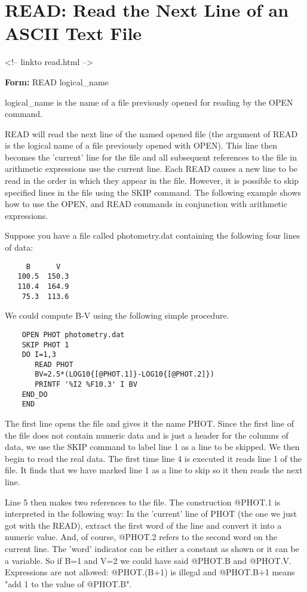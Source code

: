 \section{READ: Read the Next Line of an ASCII Text File}
\begin{rawhtml}
<!-- linkto read.html -->
\end{rawhtml}
\begin{command}
  \item[\textbf{Form: }READ logical\_name\hfill]{}
  \item[logical\_name]{is the name of a file previously
       opened for reading by the OPEN command.}
\end{command}

READ will read the next line of the named opened file (the argument of READ
is the logical name of a file previously opened with OPEN).  This line then
becomes the 'current' line for the file and all subsequent references to
the file in arithmetic expressions use the current line.  Each READ causes
a new line to be read in the order in which they appear in the file.
However, it is possible to skip specified lines in the file using the SKIP
command. The following example shows how to use the OPEN, and READ commands
in conjunction with arithmetic expressions.

Suppose you have a file called photometry.dat containing the following four
lines of data:
\begin{verbatim}
     B      V
   100.5  150.3
   110.4  164.9
    75.3  113.6
\end{verbatim}
We could compute B-V using the following simple procedure.
\begin{verbatim}
    OPEN PHOT photometry.dat
    SKIP PHOT 1
    DO I=1,3
       READ PHOT
       BV=2.5*(LOG10{[@PHOT.1]}-LOG10{[@PHOT.2]})
       PRINTF '%I2 %F10.3' I BV
    END_DO
    END
\end{verbatim}
The first line opens the file and gives it the name PHOT.  Since the first
line of the file does not contain numeric data and is just a header for the
columns of data, we use the SKIP command to label line 1 as a line to be
skipped.  We then begin to read the real data. The first time line 4 is
executed it reads line 1 of the file.  It finds that we have marked line 1
as a line to skip so it then reads the next line.

Line 5 then makes two references to the file.  The construction @PHOT.1 is
interpreted in the following way: In the 'current' line of PHOT (the one we
just got with the READ), extract the first word of the line and convert it
into a numeric value.  And, of course, @PHOT.2 refers to the second word on
the current line.  The 'word' indicator can be either a constant as shown
or it can be a variable. So if B=1 and V=2 we could have said @PHOT.B and
@PHOT.V.  Expressions are not allowed: @PHOT.(B+1) is illegal and @PHOT.B+1
means "add 1 to the value of @PHOT.B".

